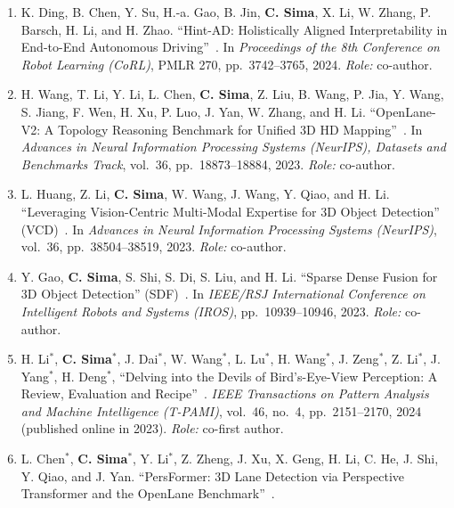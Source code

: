 \begin{enumerate}[label={\arabic*.}, leftmargin=2.4em, labelwidth=1.8em, labelsep=0.6em, align=left, itemsep=4pt, resume]
        ``Are VLMs Ready for Autonomous Driving? An Empirical Study from the Reliability, Data, and Metric Perspectives'' (DriveBench)~\cite{xie2025vlms}.
        In \emph{IEEE/CVF International Conference on Computer Vision (ICCV)}, pp.~6585--6597, 2025.
        \emph{Role:} co-author.
  \item K. Ding, B. Chen, Y. Su, H.-a. Gao, B. Jin, \textbf{C. Sima}, X. Li, W. Zhang, P. Barsch, H. Li, and H. Zhao.
        ``Hint-AD: Holistically Aligned Interpretability in End-to-End Autonomous Driving''~\cite{ding2024hint}.
        In \emph{Proceedings of the 8th Conference on Robot Learning (CoRL)}, PMLR 270, pp.~3742--3765, 2024.
        \emph{Role:} co-author.
  \item H. Wang, T. Li, Y. Li, L. Chen, \textbf{C. Sima}, Z. Liu, B. Wang, P. Jia, Y. Wang, S. Jiang, F. Wen, H. Xu, P. Luo, J. Yan, W. Zhang, and H. Li.
        ``OpenLane-V2: A Topology Reasoning Benchmark for Unified 3D HD Mapping''~\cite{wang2023openlanev2}.
        In \emph{Advances in Neural Information Processing Systems (NeurIPS), Datasets and Benchmarks Track}, vol.~36, pp.~18873--18884, 2023.
        \emph{Role:} co-author.
  \item L. Huang, Z. Li, \textbf{C. Sima}, W. Wang, J. Wang, Y. Qiao, and H. Li.
        ``Leveraging Vision-Centric Multi-Modal Expertise for 3D Object Detection'' (VCD)~\cite{huang2023vcd}.
        In \emph{Advances in Neural Information Processing Systems (NeurIPS)}, vol.~36, pp.~38504--38519, 2023.
        \emph{Role:} co-author.
  \item Y. Gao, \textbf{C. Sima}, S. Shi, S. Di, S. Liu, and H. Li.
        ``Sparse Dense Fusion for 3D Object Detection'' (SDF)~\cite{gao2023sdf}.
        In \emph{IEEE/RSJ International Conference on Intelligent Robots and Systems (IROS)}, pp.~10939--10946, 2023.
        \emph{Role:} co-author.
  \item H. Li$^{*}$, \textbf{C. Sima}$^{*}$, J. Dai$^{*}$, W. Wang$^{*}$, L. Lu$^{*}$, H. Wang$^{*}$, J. Zeng$^{*}$, Z. Li$^{*}$, J. Yang$^{*}$, H. Deng$^{*}$, \etal
        ``Delving into the Devils of Bird's-Eye-View Perception: A Review, Evaluation and Recipe''~\cite{li2023bevdevils}.
        \emph{IEEE Transactions on Pattern Analysis and Machine Intelligence (T-PAMI)}, vol.~46, no.~4, pp.~2151--2170, 2024 (published online in 2023).
        \emph{Role:} co-first author.
  \item L. Chen$^{*}$, \textbf{C. Sima}$^{*}$, Y. Li$^{*}$, Z. Zheng, J. Xu, X. Geng, H. Li, C. He, J. Shi, Y. Qiao, and J. Yan.
        ``PersFormer: 3D Lane Detection via Perspective Transformer and the OpenLane Benchmark''~\cite{chen2022persformer}.

\end{enumerate}
